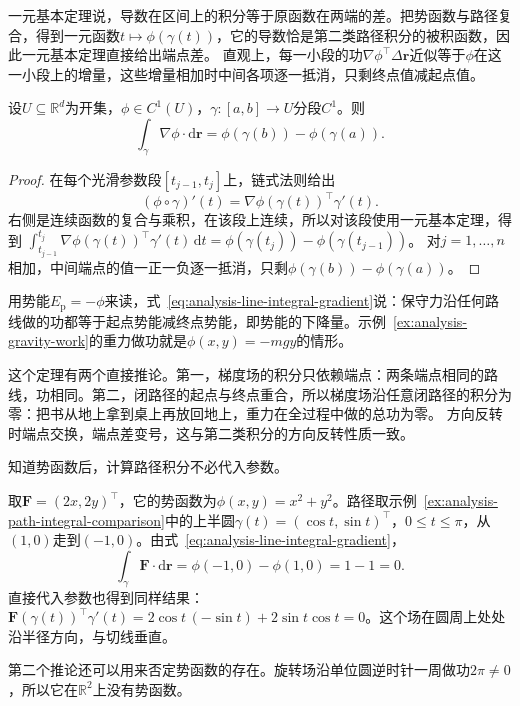 一元基本定理说，导数在区间上的积分等于原函数在两端的差。把势函数与路径复合，得到一元函数$t\mapsto\phi(\gamma(t))$，它的导数恰是第二类路径积分的被积函数，因此一元基本定理直接给出端点差。
直观上，每一小段的功$\nabla\phi^\top\Delta\bm r$近似等于$\phi$在这一小段上的增量，这些增量相加时中间各项逐一抵消，只剩终点值减起点值。
\begin{theorem}[路径积分基本定理]
设$U\subseteq\mathbb R^d$为开集，$\phi\in C^1(U)$，$\gamma:[a,b]\to U$分段$C^1$。则
\begin{equation}
  \int_{\gamma}\nabla\phi\mathbin{\cdot}\mathrm{d}\bm{r}
  =\phi(\gamma(b))-\phi(\gamma(a)).
\label{eq:analysis-line-integral-gradient}
\end{equation}
\end{theorem}
\begin{proof}
在每个光滑参数段$[t_{j-1},t_j]$上，链式法则给出
\[
 (\phi\circ\gamma)'(t)=\nabla\phi(\gamma(t))^\top\gamma'(t).
\]
右侧是连续函数的复合与乘积，在该段上连续，所以对该段使用一元基本定理，得到
$\int_{t_{j-1}}^{t_j}\nabla\phi(\gamma(t))^\top\gamma'(t)\,\mathrm dt=\phi(\gamma(t_j))-\phi(\gamma(t_{j-1}))$。
对$j=1,\dots,n$相加，中间端点的值一正一负逐一抵消，只剩$\phi(\gamma(b))-\phi(\gamma(a))$。
\end{proof}

用势能$E_{\mathrm p}=-\phi$来读，式~\eqref{eq:analysis-line-integral-gradient}说：保守力沿任何路线做的功都等于起点势能减终点势能，即势能的下降量。示例~\ref{ex:analysis-gravity-work}的重力做功就是$\phi(x,y)=-mgy$的情形。

这个定理有两个直接推论。第一，梯度场的积分只依赖端点：两条端点相同的路线，功相同。第二，闭路径的起点与终点重合，所以梯度场沿任意闭路径的积分为零：把书从地上拿到桌上再放回地上，重力在全过程中做的总功为零。
方向反转时端点交换，端点差变号，这与第二类积分的方向反转性质一致。

知道势函数后，计算路径积分不必代入参数。
\begin{example}[用势函数计算沿半圆的积分]
取$\bm F=(2x,2y)^\top$，它的势函数为$\phi(x,y)=x^2+y^2$。路径取示例~\ref{ex:analysis-path-integral-comparison}中的上半圆$\gamma(t)=(\cos t,\sin t)^\top$，$0\leq t\leq\pi$，从$(1,0)$走到$(-1,0)$。由式~\eqref{eq:analysis-line-integral-gradient}，
\[
 \int_\gamma\bm F\cdot\mathrm d\bm r=\phi(-1,0)-\phi(1,0)=1-1=0.
\]
直接代入参数也得到同样结果：$\bm F(\gamma(t))^\top\gamma'(t)=2\cos t\,(-\sin t)+2\sin t\cos t=0$。这个场在圆周上处处沿半径方向，与切线垂直。
\end{example}

第二个推论还可以用来否定势函数的存在。旋转场沿单位圆逆时针一周做功$2\pi\neq0$，所以它在$\mathbb R^2$上没有势函数。

